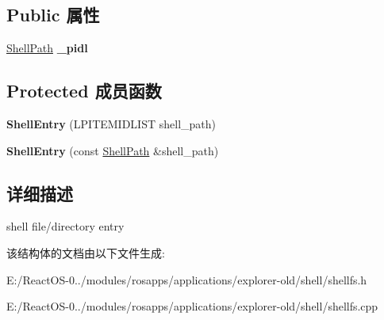 \subsection*{Public 属性}
\begin{DoxyCompactItemize}
\item 
\mbox{\label{struct_shell_entry_adf0bb6eefbbae32e05316b8c6e6b21c6}} 
\hyperlink{struct_shell_path}{Shell\+Path} {\bfseries \+\_\+pidl}
\end{DoxyCompactItemize}
\subsection*{Protected 成员函数}
\begin{DoxyCompactItemize}
\item 
\mbox{\label{struct_shell_entry_a607fe3be336cc7116737266ef8543669}} 
{\bfseries Shell\+Entry} (L\+P\+I\+T\+E\+M\+I\+D\+L\+I\+ST shell\+\_\+path)
\item 
\mbox{\label{struct_shell_entry_a1c546f2d1a81659633d0bf38e294ff5c}} 
{\bfseries Shell\+Entry} (const \hyperlink{struct_shell_path}{Shell\+Path} \&shell\+\_\+path)
\end{DoxyCompactItemize}


\subsection{详细描述}
shell file/directory entry 

该结构体的文档由以下文件生成\+:\begin{DoxyCompactItemize}
\item 
E\+:/\+React\+O\+S-\/0../modules/rosapps/applications/explorer-\/old/shell/shellfs.\+h\item 
E\+:/\+React\+O\+S-\/0../modules/rosapps/applications/explorer-\/old/shell/shellfs.\+cpp\end{DoxyCompactItemize}
